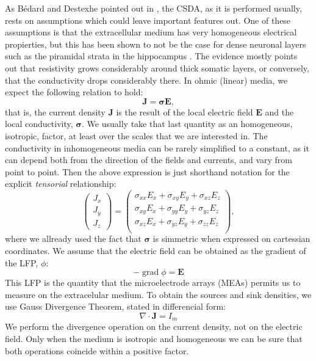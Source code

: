 \documentclass{article}
\newcommand{\Jd}{\mathbf{J}}
\newcommand{\EF}{\mathbf{E}}
\newcommand{\cond}{\boldsymbol{\sigma}}
\DeclareMathOperator{\grad}{grad}
\begin{document}
As Bédard and Destexhe pointed out in \cite{Bedard11}, the CSDA, as it
is performed usually, rests on
assumptions which could leave important features out. One of these 
assumptions is that the extracellular medium has very homogeneous 
electrical propierties, but this has been shown to not be
the case for dense neuronal layers such as the piramidal
strata in the hippocampus \cite{Holsheimer87, Lopez01, TrevinoPersonal}.
The evidence mostly points out that resistivity grows 
considerably around thick somatic layers, or conversely, that
the conductivity drops considerably there. In ohmic (linear) media,
we expect the following relation to hold:
\begin{equation}
\Jd=\cond \EF,
\end{equation}
that is, the current density $\Jd$ is the result of the
local electric field $\EF$ and the local conductivity, $\cond$.
We usually take that last quantity as an homogeneous, isotropic,
factor, at least over the scales that we are interested in.
The conductivity in inhomogeneous media can be rarely
simplified to a constant, as it can depend both from the direction
of the fields and currents, and vary from point to point. 
Then the above expression is just shorthand notation for the
explicit  \emph{tensorial} relationship:
\begin{equation}
  \begin{pmatrix}
    J_x \\
    J_y \\
    J_z
  \end{pmatrix}
  =
   \begin{pmatrix}
     \sigma_{xx}E_x+ \sigma_{xy}E_y+\sigma_{xz}E_z \\
     \sigma_{xy}E_x+ \sigma_{yy}E_y+\sigma_{yz}E_z \\
     \sigma_{xz}E_x+ \sigma_{yz}E_y+\sigma_{zz}E_z \\
  \end{pmatrix},
\end{equation}
where we allready used the fact that $\cond$ is simmetric when
expressed on cartessian coordinates.
We assume that the electric field can be obtained as the
gradient of the LFP, $\phi$:
\begin{equation}
  -\grad \phi=\EF
\end{equation}
This LFP is the quantity that the microelectrode arrays (MEAs) permits us
to measure on the extracelular medium.
To obtain the sources and sink densities, we use Gauss Divergence Theorem,
stated in differencial form:
\begin{equation}
\nabla \cdot \Jd =I_m
\end{equation}
We perform the divergence operation on the current density, not
on the electric field. Only when the medium is isotropic and homogeneous
we can be sure that both operations coincide within a positive factor.
\end{document}
